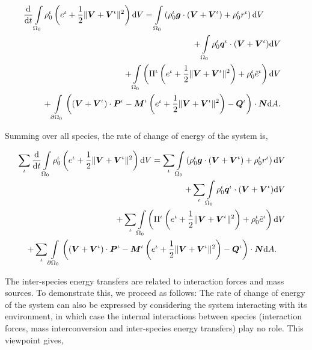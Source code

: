 \begin{eqnarray}
\frac{\mathrm{d}}{\mathrm{d}t} \int\limits_{\Omega_0}\rho_0^\iota
\left ( e^\iota + \frac{1}{2} \Vert\mbox{\boldmath$ V$}+\mbox{\boldmath$ V$}^\iota\Vert^2 \right )
\mathrm{d}V =  \int\limits_{\Omega_0} \left(\rho_0^\iota\mbox{\boldmath$ g$}
\cdot\left(\mbox{\boldmath$ V$}+\mbox{\boldmath$ V$}^\iota\right) + \rho_0^\iota r^\iota
\right)\mathrm{d}V\qquad& &\nonumber\\
+\int\limits_{\Omega_0}\rho_0^\iota\mbox{\boldmath$ q$}^\iota\cdot(\mbox{\boldmath$ V$}+\mbox{\boldmath$ V$}^\iota)\mathrm{d}V&
&\nonumber\\
+ \int\limits_{\Omega_0} \left(\Pi^\iota\left(e^\iota
+ \frac{1}{2}\Vert\mbox{\boldmath$ V$}+\mbox{\boldmath$ V$}^\iota\Vert^2\right)+\rho^\iota_0\tilde{e}^\iota\right)\mathrm{d}V & & \nonumber \\
+\int\limits_{\partial
\Omega_0}\left(\left(\mbox{\boldmath$ V$}+\mbox{\boldmath$ V$}^\iota\right)\cdot\mbox{\boldmath$ P$}^\iota -
\mbox{\boldmath$ M$}^\iota\left(e^\iota +\frac{1}{2}
\Vert\mbox{\boldmath$ V$}+\mbox{\boldmath$ V$}^\iota\Vert^2\right) -
\mbox{\boldmath$ Q$}^\iota\right)\cdot\mbox{\boldmath$ N$}\mathrm{d}A. \label{energyspecies1}
\end{eqnarray}

\noindent Summing over all species, the rate of change of energy
of the system is,

\begin{eqnarray}
\sum\limits_{\iota}\frac{\mathrm{d}}{\mathrm{d}t}
\int\limits_{\Omega_0}\rho_0^\iota \left ( e^\iota + \frac{1}{2}
\Vert\mbox{\boldmath$ V$}+\mbox{\boldmath$ V$}^\iota\Vert^2 \right ) \mathrm{d}V =
\sum\limits_{\iota}\int\limits_{\Omega_0} \left(\rho_0^\iota\mbox{\boldmath$ g$}
\cdot\left(\mbox{\boldmath$ V$}+\mbox{\boldmath$ V$}^\iota\right) + \rho_0^\iota r^\iota \right)\mathrm{d}V& &\nonumber\\
+\sum\limits_{\iota}\int\limits_{\Omega_0}\rho_0^\iota\mbox{\boldmath$ q$}^\iota\cdot(\mbox{\boldmath$ V$}+\mbox{\boldmath$ V$}^\iota)\mathrm{d}V&
&\nonumber\\
+ \sum\limits_{\iota}\int\limits_{\Omega_0}
\left(\Pi^\iota\left(e^\iota
+ \frac{1}{2}\Vert\mbox{\boldmath$ V$}+\mbox{\boldmath$ V$}^\iota\Vert^2\right)+\rho^\iota_0\tilde{e}^\iota\right)\mathrm{d}V & & \nonumber \\
+\sum\limits_{\iota}\int\limits_{\partial
\Omega_0}\left(\left(\mbox{\boldmath$ V$}+\mbox{\boldmath$ V$}^\iota\right)\cdot\mbox{\boldmath$ P$}^\iota -
\mbox{\boldmath$ M$}^\iota\left(e^\iota +\frac{1}{2}
\Vert\mbox{\boldmath$ V$}+\mbox{\boldmath$ V$}^\iota\Vert^2\right) -
\mbox{\boldmath$ Q$}^\iota\right)\cdot\mbox{\boldmath$ N$}\mathrm{d}A.\quad& & \label{energysum}
\end{eqnarray}

The inter-species energy transfers are related to interaction
forces and mass sources. To demonstrate this, we proceed as
follows: The rate of change of energy of the system can also be
expressed by considering the system interacting with its
environment, in which case the internal interactions between
species (interaction forces, mass interconversion and
inter-species energy transfers) play no role. This viewpoint
gives,

